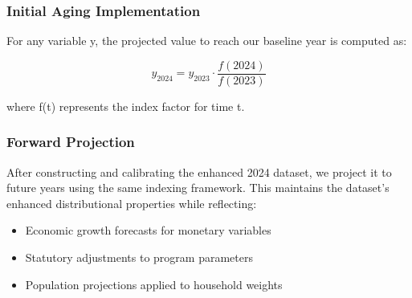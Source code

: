 \subsubsection{Initial Aging Implementation}

For any variable y, the projected value to reach our baseline year is computed as:

\[ y_{2024} = y_{2023} \cdot \frac{f(2024)}{f(2023)} \]

where f(t) represents the index factor for time t.

\subsubsection{Forward Projection}

After constructing and calibrating the enhanced 2024 dataset, we project it to future years using the same indexing framework. This maintains the dataset's enhanced distributional properties while reflecting:

\begin{itemize}
    \item Economic growth forecasts for monetary variables
    \item Statutory adjustments to program parameters
    \item Population projections applied to household weights
\end{itemize}